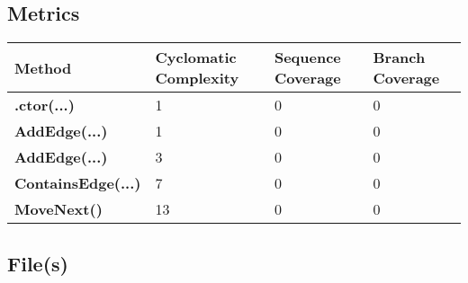 \documentclass[a4paper,10pt]{article}
\begin{document}
\subsection{Metrics}
\begin{longtable}[l]{|l|l|l|l|}
\hline
\textbf{Method} & \textbf{Cyclomatic Complexity} & \textbf{Sequence Coverage} & \textbf{Branch Coverage}\\
\hline
\textbf{.ctor(...)} & 1 & 0 & 0\\
\hline
\textbf{AddEdge(...)} & 1 & 0 & 0\\
\hline
\textbf{AddEdge(...)} & 3 & 0 & 0\\
\hline
\textbf{ContainsEdge(...)} & 7 & 0 & 0\\
\hline
\textbf{MoveNext()} & 13 & 0 & 0\\
\hline
\end{longtable}
\subsection{File(s)}
\end{document}
